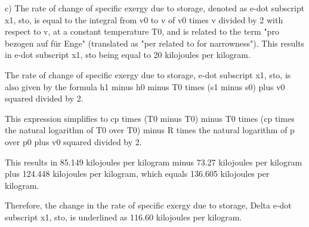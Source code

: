 c) The rate of change of specific exergy due to storage, denoted as e-dot subscript x1, sto, is equal to the integral from v0 to v of v0 times v divided by 2 with respect to v, at a constant temperature T0, and is related to the term "pro bezogen auf für Enge" (translated as "per related to for narrowness"). This results in e-dot subscript x1, sto being equal to 20 kilojoules per kilogram.

The rate of change of specific exergy due to storage, e-dot subscript x1, sto, is also given by the formula h1 minus h0 minus T0 times (s1 minus s0) plus v0 squared divided by 2.

This expression simplifies to cp times (T0 minus T0) minus T0 times (cp times the natural logarithm of T0 over T0) minus R times the natural logarithm of p over p0 plus v0 squared divided by 2.

This results in 85.149 kilojoules per kilogram minus 73.27 kilojoules per kilogram plus 124.448 kilojoules per kilogram, which equals 136.605 kilojoules per kilogram.

Therefore, the change in the rate of specific exergy due to storage, Delta e-dot subscript x1, sto, is underlined as 116.60 kilojoules per kilogram.